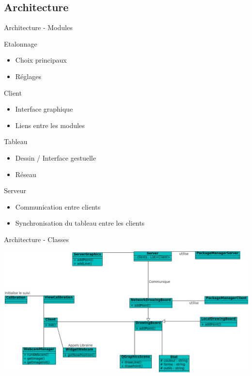 \documentclass{beamer}
\begin{document}
		\subsection{Architecture}
		\begin{frame}{Architecture - Modules}
			\pause
			\begin{block}{Etalonnage}
				\begin{itemize}
					\item Choix principaux
					\item Réglages
				\end{itemize}
			\end{block}
			\pause
			\begin{block}{Client}
				\begin{itemize}
					\item Interface graphique
					\item Liens entre les modules
				\end{itemize}
			\end{block}
			\pause
			\begin{block}{Tableau}
				\begin{itemize}
					\item Dessin / Interface gestuelle
					\item Réseau
				\end{itemize}
			\end{block}
			\pause
			\begin{block}{Serveur}
				\begin{itemize}
					\item Communication entre clients
					\item Synchronisation du tableau entre les clients
				\end{itemize}
			\end{block}
		\end{frame}
	
		\begin{frame}{Architecture - Classes}
			\begin{center}		
				\includegraphics[scale=0.45]{../uml/classes.png}
			\end{center}
		\end{frame}
		
\end{document}
